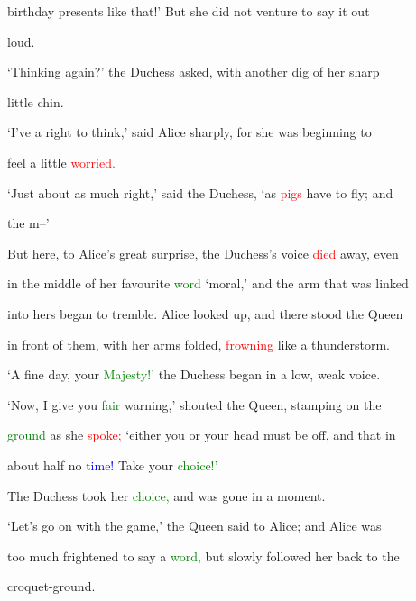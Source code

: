  \textcolor{BurntOrange}{birthday} \textcolor{BurntOrange}{presents} like that!’ But she did not venture to say it out

 loud.



 ‘Thinking again?’ the Duchess asked, with another dig of her sharp

 little chin.



 ‘I’ve a right to think,’ said Alice sharply, for she was beginning to

 feel a little \textcolor{red}{worried.}



 ‘Just about as much right,’ said the Duchess, ‘as \textcolor{red}{pigs} have to fly; and

 the m--’



 But here, to Alice’s great \textcolor{BurntOrange}{surprise,} the Duchess’s voice \textcolor{red}{died} away, even

 in the middle of her favourite \textcolor{green}{word} \textcolor{BurntOrange}{‘moral,’} and the arm that was linked

 into hers began to tremble. Alice looked up, and there stood the Queen

 in front of them, with her arms folded, \textcolor{red}{frowning} like a thunderstorm.



 ‘A fine day, your \textcolor{green}{Majesty!’} the Duchess began in a low, weak voice.



 ‘Now, I give you \textcolor{green}{fair} \textcolor{BurntOrange}{warning,’} \textcolor{BurntOrange}{shouted} the Queen, stamping on the

 \textcolor{green}{ground} as she \textcolor{red}{spoke;} ‘either you or your head must be off, and that in

 about half no \textcolor{blue}{time!} Take your \textcolor{green}{choice!’}



 The Duchess took her \textcolor{green}{choice,} and was gone in a moment.



 ‘Let’s go on with the game,’ the Queen said to Alice; and Alice was

 too much \textcolor{BurntOrange}{frightened} to say a \textcolor{green}{word,} but slowly followed her back to the

 croquet-ground.



